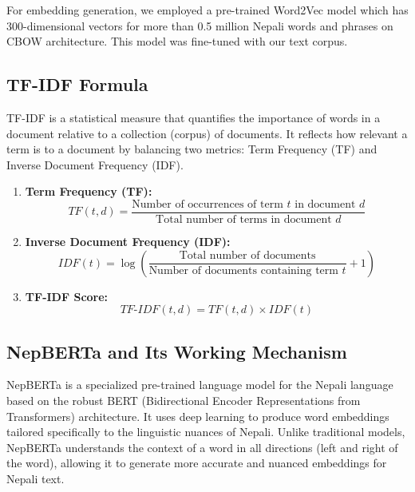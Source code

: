 For embedding generation, we employed a pre-trained Word2Vec model which has 300-dimensional vectors for more than 0.5 million Nepali words and phrases \cite{dz6s-my90-19} on CBOW architecture. This model was fine-tuned with our text corpus.
\subsection{TF-IDF Formula}
TF-IDF is a statistical measure that quantifies the importance of words in a document relative to a collection (corpus) of documents. It reflects how relevant a term is to a document by balancing two metrics: Term Frequency (TF) and Inverse Document Frequency (IDF).
\begin{enumerate}
    \item \textbf{Term Frequency (TF):}
    \[
    TF(t, d) = \frac{\text{Number of occurrences of term } t \text{ in document } d}{\text{Total number of terms in document } d}
    \]

    \item \textbf{Inverse Document Frequency (IDF):}
    \[
    IDF(t) = \log \left( \frac{\text{Total number of documents}}{\text{Number of documents containing term } t} + 1 \right)
    \]

    \item \textbf{TF-IDF Score:}
    \[
    TF\text{-}IDF(t, d) = TF(t, d) \times IDF(t)
    \]
\end{enumerate}

\subsection{NepBERTa and Its Working Mechanism}
NepBERTa is a specialized pre-trained language model for the Nepali language based on the robust BERT (Bidirectional Encoder Representations from Transformers) architecture. It uses deep learning to produce word embeddings tailored specifically to the linguistic nuances of Nepali. Unlike traditional models, NepBERTa understands the context of a word in all directions (left and right of the word), allowing it to generate more accurate and nuanced embeddings for Nepali text.

